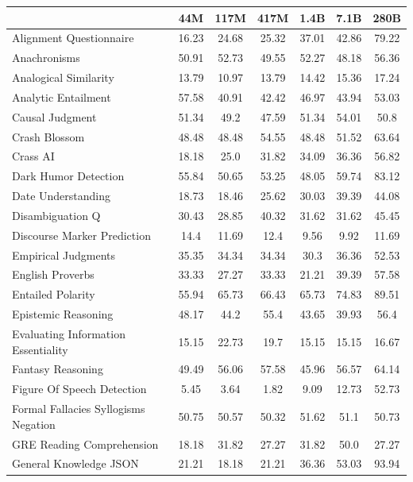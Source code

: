 \documentclass[11pt, a4paper, logo, internal, copyright, nonumbering]{deepmind}
\begin{document}
\begin{table}[ht]
\scriptsize
    \centering
\begin{tabular}{lcccccc}
\toprule
&  \textbf{44M} & \textbf{117M} & \textbf{417M} & \textbf{1.4B} & \textbf{7.1B} & \textbf{280B} \\ \midrule
Alignment Questionnaire &  16.23 & 24.68 & 25.32 & 37.01 & 42.86 & 79.22 \\ 
Anachronisms &  50.91 & 52.73 & 49.55 & 52.27 & 48.18 & 56.36 \\ 
Analogical Similarity &  13.79 & 10.97 & 13.79 & 14.42 & 15.36 & 17.24 \\ 
Analytic Entailment &  57.58 & 40.91 & 42.42 & 46.97 & 43.94 & 53.03 \\ 
Causal Judgment &  51.34 & 49.2 & 47.59 & 51.34 & 54.01 & 50.8 \\ 
Crash Blossom &  48.48 & 48.48 & 54.55 & 48.48 & 51.52 & 63.64 \\ 
Crass AI &  18.18 & 25.0 & 31.82 & 34.09 & 36.36 & 56.82 \\ 
Dark Humor Detection &  55.84 & 50.65 & 53.25 & 48.05 & 59.74 & 83.12 \\ 
Date Understanding &  18.73 & 18.46 & 25.62 & 30.03 & 39.39 & 44.08 \\ 
Disambiguation Q &  30.43 & 28.85 & 40.32 & 31.62 & 31.62 & 45.45 \\ 
Discourse Marker Prediction &  14.4 & 11.69 & 12.4 & 9.56 & 9.92 & 11.69 \\ 
Empirical Judgments &  35.35 & 34.34 & 34.34 & 30.3 & 36.36 & 52.53 \\ 
English Proverbs &  33.33 & 27.27 & 33.33 & 21.21 & 39.39 & 57.58 \\ 
Entailed Polarity &  55.94 & 65.73 & 66.43 & 65.73 & 74.83 & 89.51 \\ 
Epistemic Reasoning &  48.17 & 44.2 & 55.4 & 43.65 & 39.93 & 56.4 \\ 
Evaluating Information Essentiality &  15.15 & 22.73 & 19.7 & 15.15 & 15.15 & 16.67 \\ 
Fantasy Reasoning &  49.49 & 56.06 & 57.58 & 45.96 & 56.57 & 64.14 \\ 
Figure Of Speech Detection &  5.45 & 3.64 & 1.82 & 9.09 & 12.73 & 52.73 \\ 
Formal Fallacies Syllogisms Negation &  50.75 & 50.57 & 50.32 & 51.62 & 51.1 & 50.73 \\ 
GRE Reading Comprehension &  18.18 & 31.82 & 27.27 & 31.82 & 50.0 & 27.27 \\ 
General Knowledge JSON &  21.21 & 18.18 & 21.21 & 36.36 & 53.03 & 93.94 \\ 

\end{tabular}
\end{table}
\end{document}
